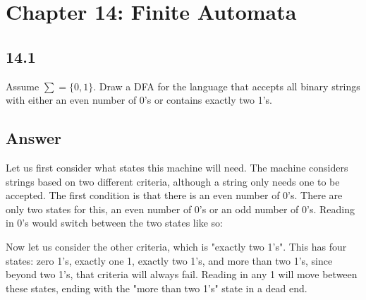\documentclass{article}
\begin{document}
\section*{Chapter 14: Finite Automata}
\subsection*{14.1}
Assume $\sum=\{0,1\}$. Draw a DFA for the language that accepts all binary strings with either an even number of 0's or contains exactly two 1's.
\subsection*{Answer}
Let us first consider what states this machine will need. The machine considers strings based on two different criteria, although a string only needs one to be accepted. The first condition is that there is an even number of 0's. There are only two states for this, an even number of 0's or an odd number of 0's. Reading in 0's would switch between the two states like so:
\begin{center}
\end{center}
Now let us consider the other criteria, which is "exactly two 1's". This has four states: zero 1's, exactly one 1, exactly two 1's, and more than two 1's, since beyond two 1's, that criteria will always fail. Reading in any 1 will move between these states, ending with the "more than two 1's" state in a dead end.
\end{document}
